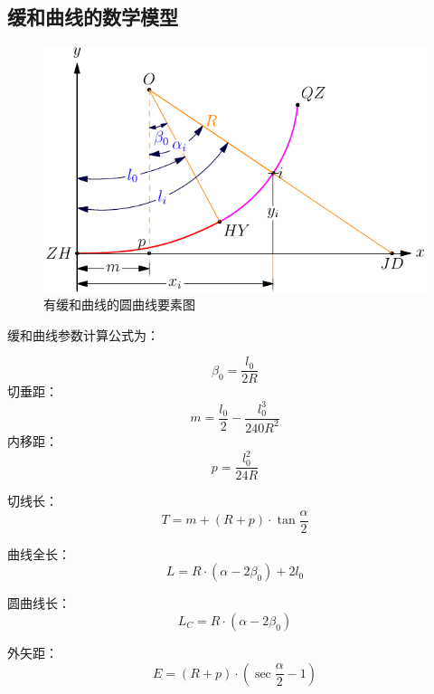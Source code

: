  
 \subsection{缓和曲线的数学模型}

 \begin{figure}[htbp]
    \centering
    \includegraphics[scale=1]{route/HCircleRoute.pdf}
    \caption{有缓和曲线的圆曲线要素图}
    \label{fig:HCircleRoute}
\end{figure}

 缓和曲线参数计算公式为：

 $$\beta_0 = \frac{l_0}{2R} $$
切垂距：
$$m=\frac{l_0}{2} - \frac{l^3_0}{240R^2}$$
内移距：
$$p=\frac{l^2_0}{24R}$$

 
 切线长：$$T = m+ (R+p) \cdot \tan \frac{\alpha}{2}$$

 曲线全长：$$L = R \cdot (\alpha-2\beta_0)  + 2l_0$$

 圆曲线长：$$L_C = R \cdot (\alpha-2\beta_0)$$

 外矢距：$$E=(R+p) \cdot (\sec \frac{\alpha}{2} - 1)$$

